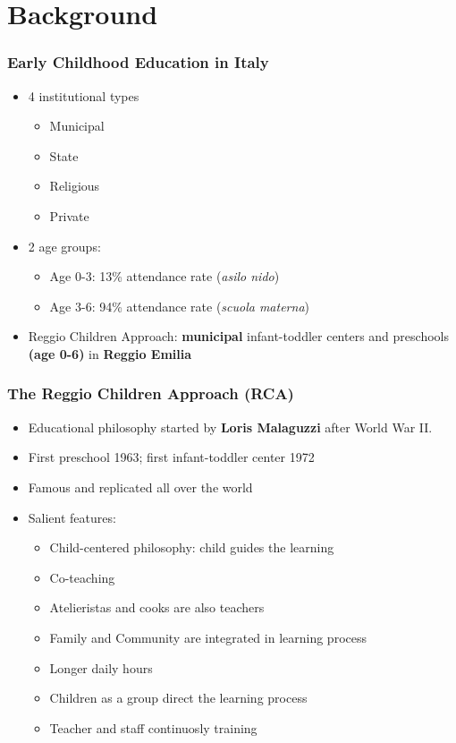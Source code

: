 \section{Background}
\begin{frame}
\frametitle{Early Childhood Education in Italy}\label{frame:ECE_IT}
\begin{itemize}
	\item 4 institutional types
	\begin{itemize}
		\item Municipal
		\item State
		\item Religious
		\item Private
	\end{itemize}
	\vspace{1ex}
	\item 2 age groups:
	\begin{itemize}
		\item Age 0-3: 13\% attendance rate (\textit{asilo nido})
		\item Age 3-6: 94\% attendance rate (\textit{scuola materna})
	\end{itemize}
	
	\vspace{3ex}
	
	\item[] Reggio Children Approach: \textbf{municipal} infant-toddler centers and preschools \textbf{(age 0-6)} in \textbf{Reggio Emilia}
\end{itemize} 
\end{frame} 

\begin{frame}
\frametitle{The Reggio Children Approach (RCA)}\label{frame:reggiostyle}
\begin{itemize}
	\item Educational philosophy started by \textbf{Loris Malaguzzi} after World War II.
	\item First preschool 1963; first infant-toddler center 1972 
	\item Famous and replicated all over the world
	\item Salient features:

		\begin{itemize}
		\item Child-centered philosophy: child guides the learning
		\item Co-teaching
		\item Atelieristas and cooks are also teachers
		\item Family and Community are integrated in learning process
		\item Longer daily hours
		\item Children as a group direct the learning process
		\item Teacher and staff continuosly training
		\end{itemize} 
\end{itemize} 
\end{frame} 

